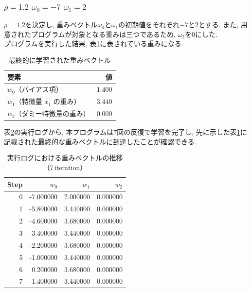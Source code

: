 \documentclass[a4j, 12pt]{jarticle}
\begin{document}
\subsubsection{$\rho=1.2$ $\omega_0=-7$ $\omega_1=2$}
$\rho=1.2$を決定し, 重みベクトル$\omega_0$と$\omega_1$の初期値をそれぞれ$-7$と$2$とする. また, 用意されたプログラムが対象となる重みは三つであるため, $\omega_2$を0にした. \\
プログラムを実行した結果, 表\ref{p12finalweights}に表されている重みになる. 
\begin{table}[H]
  \centering
  \caption{最終的に学習された重みベクトル}\label{p12finalweights}
  \begin{tabular}{l r}
    \hline
    要素 & 値 \\
    \hline
    $w_0$（バイアス項） & $1.400$ \\
    $w_1$（特徴量 $x_1$ の重み） & $3.440$ \\
    $w_2$（ダミー特徴量の重み） & $0.000$ \\
    \hline
  \end{tabular}
\end{table}
表\ref{p12logs}の実行ログから, 本プログラムは7回の反復で学習を完了し, 先に示した表\ref{p12finalweights}に記載された最終的な重みベクトルに到達したことが確認できる. 
\begin{table}[H]
  \centering
  \caption{実行ログにおける重みベクトルの推移（7\,iteration）}\label{p12logs}
  \begin{tabular}{r|rrr}
  \hline
  Step & $w_0$ & $w_1$ & $w_2$ \\
  \hline
  0 & -7.000000 & 2.000000 & 0.000000 \\
  1 & -5.800000 & 3.440000 & 0.000000 \\
  2 & -4.600000 & 3.680000 & 0.000000 \\
  3 & -3.400000 & 3.440000 & 0.000000 \\
  4 & -2.200000 & 3.680000 & 0.000000 \\
  5 & -1.000000 & 3.440000 & 0.000000 \\
  6 &  0.200000 & 3.680000 & 0.000000 \\
  7 &  1.400000 & 3.440000 & 0.000000 \\
  \hline
  \end{tabular}
\end{table}
\end{document}
